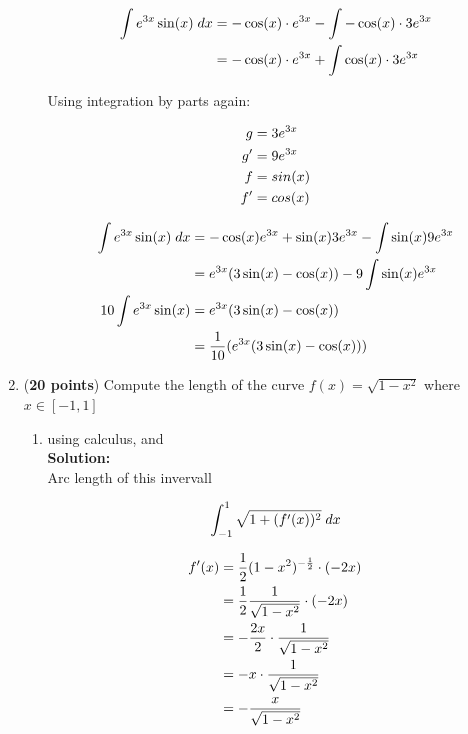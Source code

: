 \documentclass[a4paper]{article}
\begin{document}
\begin{enumerate}
\begin{enumerate}
\begin{align}
	\int e^{3x}\sin(x) \; dx &= -\cos(x) \cdot e^{3x} - \int - \cos(x) \cdot 3e^{3x}\notag\\
	&= -\cos(x)\cdot e^{3x} + \int \cos(x) \cdot 3e^{3x}\notag
\end{align}	

Using integration by parts again:
	
\begin{align}
	g &= 3e^{3x}\notag\\
	g' &= 9e^{3x}\notag\\
	f &= sin(x)\notag\\
	f' &= cos(x)\notag
\end{align}		
		
\begin{align}
	\int e^{3x}\sin(x) \; dx &= -\cos(x)e^{3x} + \sin(x)3e^{3x} - \int \sin(x)9e^{3x}\notag\\
	&= e^{3x}(3\sin(x) - \cos(x)) - 9 \int \sin(x)e^{3x}\notag\\
10 \int e^{3x}\sin(x) &= e^{3x}(3\sin(x) - \cos(x))\notag\\
&= \frac{1}{10}(e^{3x}(3\sin(x) - \cos(x)))\notag
\end{align}		
	
\end{enumerate}



\item (\textbf{20 points}) Compute the length of the curve $f(x) = \sqrt{1-x^2}$ where $x \in [-1,1]$


\begin{enumerate}
	\item using calculus, and\\
	\textbf{Solution:}\\
	
Arc length of this invervall

\begin{align}
	\int_{-1}^1 \sqrt{1 + (f'(x))^2}\;dx\notag
\end{align}	
	
\begin{align}
	f'(x) &= \frac{1}{2}(1-x^2)^{-\frac{1}{2}} \cdot (-2x)\notag\\
	&= \frac{1}{2} \frac{1}{\sqrt{1-x^2}} \cdot (-2x)\notag\\
	&= -\frac{2x}{2} \cdot \frac{1}{\sqrt{1-x^2}}\notag\\
	&= -x \cdot \frac{1}{\sqrt{1-x^2}}\notag\\
	&= -\frac{x}{\sqrt{1-x^2}}\notag
\end{align}	
	

\end{enumerate}
\end{enumerate}
\end{document}
